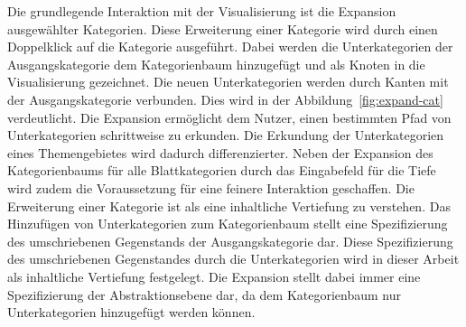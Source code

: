 Die grundlegende Interaktion mit der Visualisierung ist die Expansion ausgewählter Kategorien.
Diese Erweiterung einer Kategorie wird durch einen Doppelklick auf die Kategorie ausgeführt.
Dabei werden die Unterkategorien der Ausgangskategorie dem Kategorienbaum hinzugefügt und als Knoten in die Visualisierung gezeichnet.
Die neuen Unterkategorien werden durch Kanten mit der Ausgangskategorie verbunden.
Dies wird in der Abbildung~\ref{fig:expand-cat} verdeutlicht.
Die Expansion ermöglicht dem Nutzer, einen bestimmten Pfad von Unterkategorien schrittweise zu erkunden.
Die Erkundung der Unterkategorien eines Themengebietes wird dadurch differenzierter. 
Neben der Expansion des Kategorienbaums für alle Blattkategorien durch das Eingabefeld für die Tiefe wird zudem die Voraussetzung für eine feinere Interaktion geschaffen.
Die Erweiterung einer Kategorie ist als eine inhaltliche Vertiefung zu verstehen.
Das Hinzufügen von Unterkategorien zum Kategorienbaum stellt eine Spezifizierung des umschriebenen Gegenstands der Ausgangskategorie dar.
Diese Spezifizierung des umschriebenen Gegenstandes durch die Unterkategorien wird in dieser Arbeit als inhaltliche Vertiefung festgelegt.
Die Expansion stellt dabei immer eine Spezifizierung der Abstraktionsebene dar, da dem Kategorienbaum nur Unterkategorien hinzugefügt werden können.


